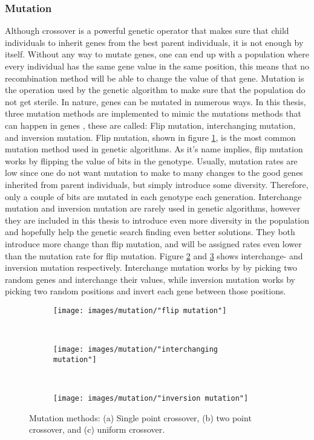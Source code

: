 \subsubsection{Mutation}
Although crossover is a powerful genetic operator that makes sure that child individuals to inherit genes from the best parent individuals, it is not enough by itself. Without any way to mutate genes, one can end up with a population where every individual has the same gene value in the same position, this means that no recombination method will be able to change the value of that gene. Mutation is the operation used by the genetic algorithm to make sure that the population do not get sterile. In nature, genes can be mutated in numerous ways. In this thesis, three mutation methods are implemented to mimic the mutations methods that can happen in genes \citep{Soni}, these are called: Flip mutation, interchanging mutation, and inversion mutation. Flip mutation, shown in figure \ref{figure:flip mutation}, is the most common mutation method used in genetic algorithms. As it's name implies, flip mutation works by flipping the value of bits in the genotype. Usually, mutation rates are low since one do not want mutation to make to many changes to the good genes inherited from parent individuals, but simply introduce some diversity. Therefore, only a couple of bits are mutated in each genotype each generation. Interchange mutation and inversion mutation are rarely used in genetic algorithms, however they are included in this thesis to introduce even more diversity in the population and hopefully help the genetic search finding even better solutions. They both introduce more change than flip mutation, and will be assigned rates even lower than the mutation rate for flip mutation. Figure \ref{figure:interchange mutation} and \ref{figure:inversion mutation} shows interchange- and inversion mutation respectively. Interchange mutation works by by picking two random genes and interchange their values, while inversion mutation works by picking two random positions and invert each gene between those positions. 


\begin{figure}[h!]
    \centering
    \begin{subfigure}[b]{0.3\textwidth}
        \texttt{[image: images/mutation/"flip mutation"]}
        \caption{}
        \label{figure:flip mutation}
    \end{subfigure}
    ~ 
    \begin{subfigure}[b]{0.3\textwidth}
        \texttt{[image: images/mutation/"interchanging mutation"]}
        \caption{}
        \label{figure:interchange mutation}
    \end{subfigure}
    ~
    \begin{subfigure}[b]{0.3\textwidth}
        \texttt{[image: images/mutation/"inversion mutation"]}
        \caption{}
        \label{figure:inversion mutation}
    \end{subfigure}
    \caption{Mutation methods: (a) Single point crossover, (b) two point crossover, and (c) uniform crossover.}
    \label{figure:mutation methods}
\end{figure}


